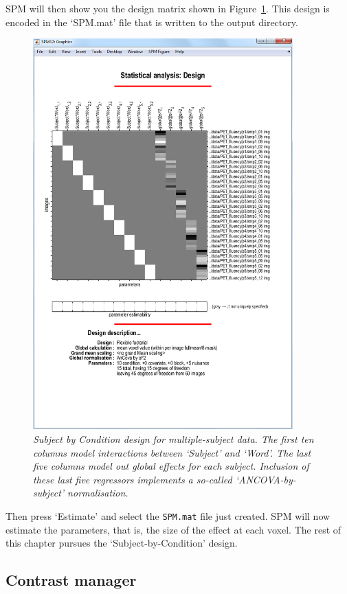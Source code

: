 SPM will then show you the design matrix shown in Figure~\ref{multi_design}. This design is encoded in the `SPM.mat' file that is written to the output directory.
\begin{figure}
\begin{center}
\includegraphics[width=100mm]{pet/multi_design}
\caption{\em Subject by Condition design for multiple-subject data. The first ten columns model interactions between `Subject' and `Word'. The last five columns model out global effects for each subject. Inclusion of these last five regressors implements
a so-called `ANCOVA-by-subject' normalisation. \label{multi_design}}
\end{center}
\end{figure}
Then press `Estimate' and select the \texttt{SPM.mat} file just created. SPM will now estimate the parameters, that is, the size of the effect at each voxel. The rest of this chapter pursues the `Subject-by-Condition' design.

\subsection{Contrast manager}

